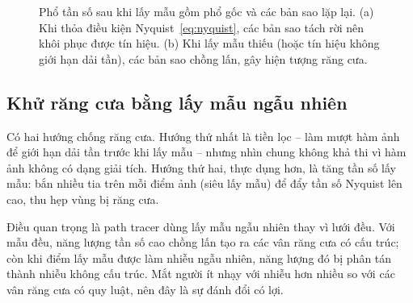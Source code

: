 \begin{figure}[H]
\centering
{}
\caption{Phổ tần số sau khi lấy mẫu gồm phổ gốc và các bản sao lặp lại. (a) Khi
thỏa điều kiện Nyquist~\eqref{eq:nyquist}, các bản sao tách rời nên khôi phục
được tín hiệu. (b) Khi lấy mẫu thiếu (hoặc tín hiệu không giới hạn dải tần), các
bản sao chồng lấn, gây hiện tượng răng cưa.}
\label{fig:nyquist}
\end{figure}

\subsection{Khử răng cưa bằng lấy mẫu ngẫu nhiên}
Có hai hướng chống răng cưa. Hướng thứ nhất là tiền lọc --
làm mượt hàm ảnh để giới hạn dải tần trước khi lấy mẫu -- nhưng nhìn chung không
khả thi vì hàm ảnh không có dạng giải tích. Hướng thứ hai, thực dụng hơn, là
tăng tần số lấy mẫu: bắn nhiều tia trên mỗi điểm ảnh (siêu lấy mẫu) để đẩy tần số Nyquist lên cao, thu hẹp vùng bị răng cưa.

Điều quan trọng là path tracer dùng lấy mẫu ngẫu nhiên thay vì lưới đều. Với mẫu đều, năng lượng tần số cao chồng lấn tạo ra
các vân răng cưa có cấu trúc; còn khi điểm lấy mẫu được làm nhiễu ngẫu
nhiên, năng lượng đó bị phân tán thành nhiễu không cấu trúc. Mắt
người ít nhạy với nhiễu hơn nhiều so với các vân răng cưa có quy luật, nên đây là
sự đánh đổi có lợi.

